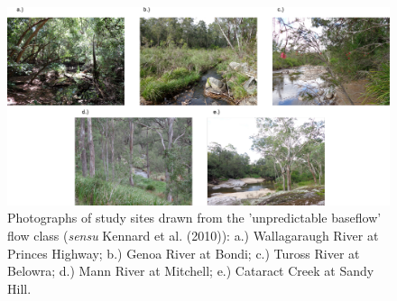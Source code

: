 \begin{landscape}
\begin{figure}[h!]
\begin{center}
\includegraphics[width=20cm]{site_photos_2.pdf} %
\caption[Photographs of study sites drawn from the 'unpredictable baseflow' flow class.]{\small{Photographs of study sites drawn from the 'unpredictable baseflow' flow class (\textit{sensu} Kennard et al. (2010)): a.) Wallagaraugh River at Princes Highway; b.) Genoa River at Bondi; c.) Tuross River at Belowra; d.) Mann River at Mitchell; e.) Cataract Creek at Sandy Hill.}} %
\label{fig:biophysical_supp_F4} %
\end{center}
\end{figure}   
\end{landscape}
\clearpage

